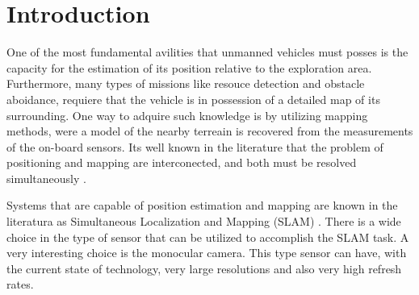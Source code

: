 \documentclass[1p]{elsarticle}
\begin{document}

\section{Introduction}

One of the most fundamental avilities that unmanned vehicles must posses is the capacity for the estimation of its position relative to the exploration area. Furthermore, many types of missions like resouce detection and obstacle aboidance, requiere that the vehicle is in possession of a detailed map of its surrounding. One way to adquire such knowledge is by utilizing mapping methods, were a model of the nearby terreain is recovered from the measurements of the on-board sensors. Its well known in the literature that the problem of positioning and mapping are interconected, and both must be resolved simultaneously \cite{Grisetti_et_all_2010}.

Systems that are capable of position estimation and mapping are known in the literatura as Simultaneous Localization and Mapping (SLAM) \cite{Cadena_et_all_2016}. There is a wide choice in the type of sensor that can be utilized to accomplish the SLAM task. A very interesting choice is the monocular camera. This type sensor can have, with the current state of technology, very large resolutions and also very high refresh rates.
\end{document}
